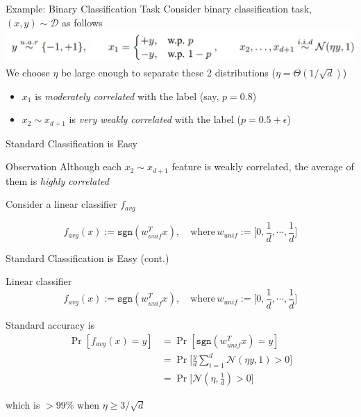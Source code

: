 \documentclass{beamer}
\begin{document}
\begin{frame}{Example: Binary Classification Task}
  Consider binary classification task, $(x,y) \sim \mathcal{D}$ as follows
  \includegraphics[width=\textwidth]{fig/cls.png}
  We choose $\eta$ be large enough to separate these 2 distributions ($\eta = \Theta(1/\sqrt{d})$)  

  \begin{itemize}
    \item $x_1$ is \textit{moderately correlated} with the label (say, $p=0.8$)
    \item $x_2 \sim x_{d+1}$ is \textit{very weakly correlated} with the label ($p = 0.5 + \epsilon$)
  \end{itemize}
\end{frame}

\begin{frame}{Standard Classification is Easy}
  \begin{block}{Observation}
    Although each $x_2 \sim x_{d+1}$ feature is weakly correlated, the average of them is \textit{highly correlated} 
  \end{block}
  Consider a linear classifier $f_{avg}$

  \[
    f_{avg}(x) := \texttt{sgn}(w_{unif}^T x), \quad \text{where} \, w_{unif}:= \Big[0,\frac{1}{d},\cdots,\frac{1}{d}\Big]
  \]

\end{frame}

\begin{frame}{Standard Classification is Easy (cont.)}
  \begin{block}{Linear classifier}
  \[
    f_{avg}(x) := \texttt{sgn}(w_{unif}^T x), \quad \text{where} \, w_{unif}:= \Big[0,\frac{1}{d},\cdots,\frac{1}{d}\Big]
  \]
  \end{block}
  Standard accuracy is 
    \begin{align*}
      \Pr[f_{avg}(x) = y] &= \Pr[\texttt{sgn}(w_{unif}^T x) = y]  \\
                          &= \Pr \Big[\frac{y}{d}\sum_{i=1}^d \mathcal{N}(\eta y,1) > 0 \Big] \\
                          &= \Pr \Big[\mathcal{N}(\eta,\frac{1}{d}) > 0 \Big]
    \end{align*}

  which is $> 99\%$ when $\eta \geq 3 / \sqrt{d}$
\end{frame}
\end{document}
